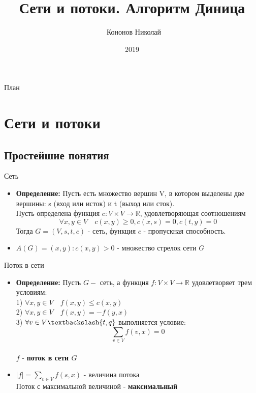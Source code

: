 \documentclass{beamer}
\title{Сети и потоки. Алгоритм Диница}
\author{~Кононов Николай}
\institute[СПБГУ]
{
    Математико-Механический факультет СПбГУ
}
\date{2019}
\begin{document}
\begin{frame}
  \titlepage
\end{frame}

\begin{frame}{План}
  \tableofcontents
\end{frame}


\section{Сети и потоки}

\subsection{Простейшие понятия}

\begin{frame}{Сеть}
  \begin{itemize}
  \item {
    \textbf{Определение: } Пусть есть множество вершин V, в котором выделены две вершины: s (вход или исток) и t (выход или сток). \\Пусть определена функция $c:V \times V \rightarrow \mathbb{R}$, удовлетворяющая соотношениям $$\forall x, y \in V \quad c(x, y) \geq 0, c(x, s) = 0, c(t, y) = 0 $$
    Тогда $ G = (V, s, t, c) $ - сеть, функция $c$ - пропускная способность.
    \pause
  }
  \item {
    $A(G) = {(x, y) : c(x, y) > 0}$ - множество стрелок сети $G$
  }
  \end{itemize}
\end{frame}

\begin{frame}{Поток в сети}
  \begin{itemize}
  \item {
    \textbf{Определение: } Пусть $G - $ сеть, а функция $f:V \times V \rightarrow \mathbb{R}$ удовлетворяет трем условиям:\\
        1) $\forall x, y \in V \quad f(x, y) \leq c(x, y)$\\
        2) $\forall x, y \in V \quad f(x, y) = -f(y, x)$\\
        3) $\forall v \in V\textbackslash{t, q}$ выполняется условие: $$ \sum\limits_{v \in V} f(v, x) = 0$$
    \\ $f$ - \textbf{поток в сети $G$}
    \pause
  }
  \item {
    $ |f| = \sum\limits_{v \in V} f(s, x)$ - величина потока\\
        Поток с максимальной величиной - \textbf{максимальный}
  }
  \end{itemize}
\end{frame}
\end{document}

